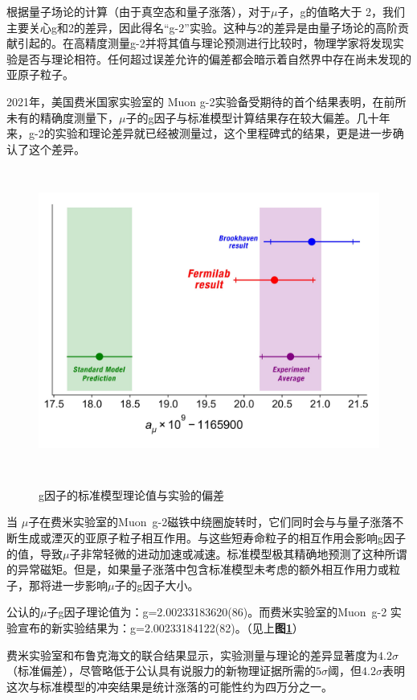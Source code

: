 根据量子场论的计算（由于真空态和量子涨落），对于$\mu$子，g的值略大于 2，我们主要关心g和2的差异，因此得名“g-2”实验。这种与2的差异是由量子场论的高阶贡献引起的。在高精度测量g-2并将其值与理论预测进行比较时，物理学家将发现实验是否与理论相符。任何超过误差允许的偏差都会暗示着自然界中存在尚未发现的亚原子粒子。

2021年，美国费米国家实验室的 Muon g-2实验备受期待的首个结果表明\cite{muong-2}，在前所未有的精确度测量下，$\mu$子的g因子与标准模型计算结果存在较大偏差。几十年来，g-2的实验和理论差异就已经被测量过，这个里程碑式的结果，更是进一步确认了这个差异。
\begin{figure}[H]
 \centering
 \caption{g因子的标准模型理论值与实验的偏差\cite{muong-2_fig}}
 \includegraphics[height=10cm, width=12cm]{pictures/Muon-g-2-results-plot.jpeg}
 \label{fig:1.2}
\end{figure}

当 $\mu$子在费米实验室的Muon\ g-2磁铁中绕圈旋转时，它们同时会与与量子涨落不断生成或湮灭的亚原子粒子相互作用。与这些短寿命粒子的相互作用会影响g因子的值，导致$\mu$子非常轻微的进动加速或减速。标准模型极其精确地预测了这种所谓的异常磁矩。但是，如果量子涨落中包含标准模型未考虑的额外相互作用力或粒子，那将进一步影响$\mu$子的g因子大小。

公认的$\mu$子g因子理论值为：g=2.00233183620(86)。而费米实验室的Muon\ g-2 实验宣布的新实验结果为：g=2.00233184122(82)。（见上\textbf{图\ref{fig:1.2}}）

费米实验室和布鲁克海文的联合结果显示，实验测量与理论的差异显著度为$4.2\sigma$（标准偏差），尽管略低于公认具有说服力的新物理证据所需的$5\sigma$阈，但$4.2\sigma$表明这次与标准模型的冲突结果是统计涨落的可能性约为四万分之一。

